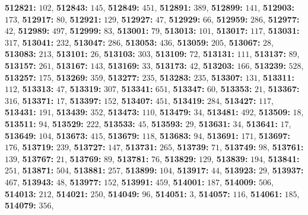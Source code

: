 \textsf{\bfseries 512821:} $102$, \textsf{\bfseries 512843:} $145$, \textsf{\bfseries 512849:} $451$, \textsf{\bfseries 512891:} $389$, \textsf{\bfseries 512899:} $141$, \textsf{\bfseries 512903:} $173$, \textsf{\bfseries 512917:} $80$, \textsf{\bfseries 512921:} $129$, \textsf{\bfseries 512927:} $47$, \textsf{\bfseries 512929:} $66$, \textsf{\bfseries 512959:} $286$, \textsf{\bfseries 512977:} $42$, \textsf{\bfseries 512989:} $497$, \textsf{\bfseries 512999:} $83$, \textsf{\bfseries 513001:} $79$, \textsf{\bfseries 513013:} $101$, \textsf{\bfseries 513017:} $117$, \textsf{\bfseries 513031:} $317$, \textsf{\bfseries 513041:} $232$, \textsf{\bfseries 513047:} $286$, \textsf{\bfseries 513053:} $436$, \textsf{\bfseries 513059:} $205$, \textsf{\bfseries 513067:} $28$, \textsf{\bfseries 513083:} $213$, \textsf{\bfseries 513101:} $26$, \textsf{\bfseries 513103:} $303$, \textsf{\bfseries 513109:} $72$, \textsf{\bfseries 513131:} $111$, \textsf{\bfseries 513137:} $89$, \textsf{\bfseries 513157:} $261$, \textsf{\bfseries 513167:} $143$, \textsf{\bfseries 513169:} $33$, \textsf{\bfseries 513173:} $42$, \textsf{\bfseries 513203:} $166$, \textsf{\bfseries 513239:} $528$, \textsf{\bfseries 513257:} $175$, \textsf{\bfseries 513269:} $359$, \textsf{\bfseries 513277:} $235$, \textsf{\bfseries 513283:} $235$, \textsf{\bfseries 513307:} $131$, \textsf{\bfseries 513311:} $112$, \textsf{\bfseries 513313:} $47$, \textsf{\bfseries 513319:} $307$, \textsf{\bfseries 513341:} $651$, \textsf{\bfseries 513347:} $60$, \textsf{\bfseries 513353:} $21$, \textsf{\bfseries 513367:} $316$, \textsf{\bfseries 513371:} $17$, \textsf{\bfseries 513397:} $152$, \textsf{\bfseries 513407:} $451$, \textsf{\bfseries 513419:} $284$, \textsf{\bfseries 513427:} $117$, \textsf{\bfseries 513431:} $191$, \textsf{\bfseries 513439:} $352$, \textsf{\bfseries 513473:} $110$, \textsf{\bfseries 513479:} $34$, \textsf{\bfseries 513481:} $492$, \textsf{\bfseries 513509:} $18$, \textsf{\bfseries 513511:} $94$, \textsf{\bfseries 513529:} $222$, \textsf{\bfseries 513533:} $45$, \textsf{\bfseries 513593:} $29$, \textsf{\bfseries 513631:} $34$, \textsf{\bfseries 513641:} $17$, \textsf{\bfseries 513649:} $104$, \textsf{\bfseries 513673:} $415$, \textsf{\bfseries 513679:} $118$, \textsf{\bfseries 513683:} $94$, \textsf{\bfseries 513691:} $171$, \textsf{\bfseries 513697:} $176$, \textsf{\bfseries 513719:} $239$, \textsf{\bfseries 513727:} $147$, \textsf{\bfseries 513731:} $265$, \textsf{\bfseries 513739:} $71$, \textsf{\bfseries 513749:} $98$, \textsf{\bfseries 513761:} $139$, \textsf{\bfseries 513767:} $21$, \textsf{\bfseries 513769:} $89$, \textsf{\bfseries 513781:} $76$, \textsf{\bfseries 513829:} $129$, \textsf{\bfseries 513839:} $194$, \textsf{\bfseries 513841:} $251$, \textsf{\bfseries 513871:} $504$, \textsf{\bfseries 513881:} $257$, \textsf{\bfseries 513899:} $104$, \textsf{\bfseries 513917:} $44$, \textsf{\bfseries 513923:} $29$, \textsf{\bfseries 513937:} $467$, \textsf{\bfseries 513943:} $48$, \textsf{\bfseries 513977:} $152$, \textsf{\bfseries 513991:} $459$, \textsf{\bfseries 514001:} $187$, \textsf{\bfseries 514009:} $506$, \textsf{\bfseries 514013:} $212$, \textsf{\bfseries 514021:} $250$, \textsf{\bfseries 514049:} $96$, \textsf{\bfseries 514051:} $3$, \textsf{\bfseries 514057:} $116$, \textsf{\bfseries 514061:} $185$, \textsf{\bfseries 514079:} $356$, 
